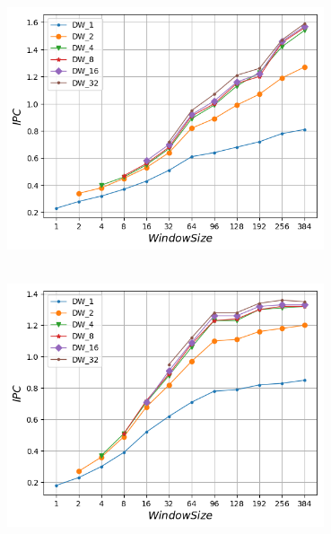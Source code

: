    \begin{minipage}{\textwidth}
      \begin{center}
         \\
         \vspace{3mm}
         \includegraphics[width=0.7\textwidth, frame]{./graphs/ipc/zeusmp.png}
         \vspace{6mm}
      \end{center}
   \end{minipage}

   \begin{minipage}{\textwidth}
      \begin{center}
         \\
         \vspace{3mm}
         \includegraphics[width=0.7\textwidth, frame]{./graphs/ipc/cactusADM.png}
         \vspace{6mm}
      \end{center}
   \end{minipage}

